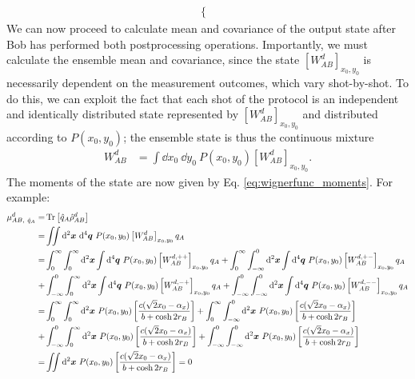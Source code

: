 \documentclass[%
 reprint,
 superscriptaddress,
 amsmath,
 amssymb,
 aps,
 pra,
]{revtex4-2}
\begin{document}
\begin{widetext}
\begin{align}
\begin{cases}
    \end{cases}
\end{align}
We can now proceed to calculate mean and covariance of the output state after Bob has performed both postprocessing operations. Importantly, we must calculate the ensemble mean and covariance, since the state $\left[ W_{AB}^d \right]_{x_0,y_0}$ is necessarily dependent on the measurement outcomes, which vary shot-by-shot. To do this, we can exploit the fact that each shot of the protocol is an independent and identically distributed state represented by $\left[ W_{AB}^d \right]_{x_0,y_0}$ and distributed according to $P(x_0,y_0)$; the ensemble state is thus the continuous mixture
\begin{align}
    W_{AB}^d &= \int \dd x_0 \ \dd y_0 \ P(x_0,y_0) \left[ W_{AB}^d \right]_{x_0,y_0}.
\end{align}
The moments of the state are now given by Eq. \eqref{eq:wignerfunc_moments}. For example:
\begin{align}
    \mu_{AB, \ \hat q_A}^d = &\Tr \left[ \hat q_A \hat \rho_{AB}^d\right] \\
    = &\iint \dd^2\bm{x} \ \dd^4 \bm{q} \ P(x_0,y_0) \left[ W_{AB}^d \right]_{x_0,y_0} q_A \\
    = &\int_0^\infty \int_0^\infty \dd^2\bm{x} \int \dd^4 \bm{q} \ P(x_0,y_0) \left[ W_{AB}^{d,++} \right]_{x_0,y_0} q_A +\int_0^\infty \int_{-\infty}^0 \dd^2\bm{x} \int \dd^4 \bm{q} \ P(x_0,y_0) \left[ W_{AB}^{d,+-} \right]_{x_0,y_0} q_A \notag \\
    + &\int_{-\infty}^0 \int_0^\infty \dd^2\bm{x} \int \dd^4 \bm{q} \ P(x_0,y_0) \left[ W_{AB}^{d,-+} \right]_{x_0,y_0} q_A + \int_{-\infty}^0 \int_{-\infty}^0 \dd^2\bm{x} \int \dd^4 \bm{q} \ P(x_0,y_0) \left[ W_{AB}^{d,--} \right]_{x_0,y_0} q_A \\
    = &\int_0^\infty \int_0^\infty \dd^2\bm{x} \ P(x_0,y_0) \left[ \frac{c(\sqrt{2}x_0 - \alpha_x)}{b + \cosh 2r_B} \right] +\int_0^\infty \int_{-\infty}^0 \dd^2\bm{x} \ P(x_0,y_0) \left[ \frac{c(\sqrt{2}x_0 - \alpha_x)}{b + \cosh 2r_B} \right] \notag\\
    + &\int_{-\infty}^0 \int_0^\infty \dd^2\bm{x} \ P(x_0,y_0) \left[ \frac{c(\sqrt{2}x_0 - \alpha_x)}{b + \cosh 2r_B} \right] + \int_{-\infty}^0 \int_{-\infty}^0 \dd^2\bm{x} \ P(x_0,y_0) \left[ \frac{c(\sqrt{2}x_0 - \alpha_x)}{b + \cosh 2r_B} \right] \\
    = &\iint \dd^2\bm{x} \ P(x_0,y_0) \left[ \frac{c(\sqrt{2}x_0 - \alpha_x)}{b + \cosh 2r_B} \right] = 0 \\

\end{align}
\end{widetext}
\end{document}
